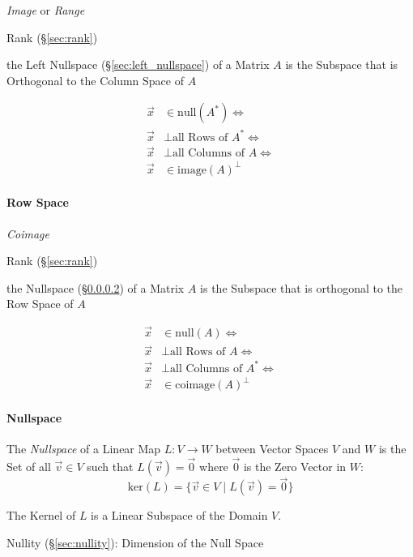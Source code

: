 \emph{Image} or \emph{Range}

Rank (\S\ref{sec:rank})

the Left Nullspace (\S\ref{sec:left_nullspace}) of a Matrix $A$ is the Subspace
that is Orthogonal to the Column Space of $A$

\begin{align*}
  \vec{x} & \in \mathrm{null}(A^*) \Leftrightarrow         \\
  \vec{x} & \bot \text{all Rows of }A^* \Leftrightarrow    \\
  \vec{x} & \bot \text{all Columns of }A \Leftrightarrow   \\
  \vec{x} & \in \mathrm{image}(A)^\bot
\end{align*}



\paragraph{Row Space}\label{sec:row_space}\hfill

\emph{Coimage}

Rank (\S\ref{sec:rank})

the Nullspace (\S\ref{sec:nullspace}) of a Matrix $A$ is the Subspace that is
orthogonal to the Row Space of $A$

\begin{align*}
  \vec{x} & \in \mathrm{null}(A) \Leftrightarrow         \\
  \vec{x} & \bot \text{all Rows of }A \Leftrightarrow    \\
  \vec{x} & \bot \text{all Columns of }A^* \Leftrightarrow   \\
  \vec{x} & \in \mathrm{coimage}(A)^\bot
\end{align*}



\paragraph{Nullspace}\label{sec:nullspace}\hfill

The \emph{Nullspace} of a Linear Map $L : V \rightarrow W$ between Vector
Spaces $V$ and $W$ is the Set of all $\vec{v}\in{V}$ such that $L(\vec{v}) =
\vec{0}$ where $\vec{0}$ is the Zero Vector in $W$:
\[
  \text{ker}(L) = \{\vec{v}\in{V} \;|\; L(\vec{v}) = \vec{0}\}
\]

The Kernel of $L$ is a Linear Subspace of the Domain $V$.

Nullity (\S\ref{sec:nullity}): Dimension of the Null Space

